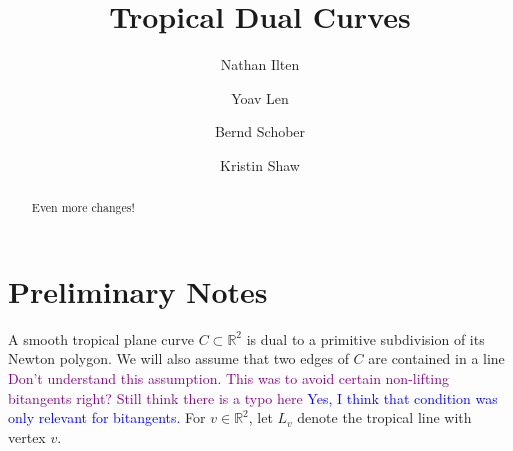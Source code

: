 \documentclass[oneside]{amsart}
\title{Tropical Dual Curves}
\author{Nathan Ilten}
\author{Yoav Len}
\author{Bernd Schober}
\author{Kristin Shaw}
\newcommand{\RR}{\mathbb{R}}
\theoremstyle{definition}
\newcommand{\yoav}[1]{\textcolor{blue}{#1}}
\newcommand{\kristin}[1]{\textcolor{purple}{#1}}
\begin{document}
\begin{abstract}
Even more changes!
\end{abstract}
\maketitle
\section{Preliminary Notes}
A smooth tropical plane curve $C\subset \mathbb{R}^2$ is dual to a primitive
subdivision of its Newton polygon. We will also assume that  two edges  of $C$
are contained in a line  \kristin{Don't understand this assumption. This was to
avoid certain non-lifting bitangents right?
Still think there is a typo here} \yoav{Yes, I think that condition was only relevant for bitangents.} For $v\in\RR^2$, let
$L_v$ denote the tropical line with vertex $v$.
\end{document}
